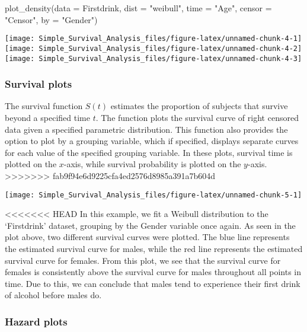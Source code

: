 \begin{Schunk}
\begin{Sinput}
plot_density(data = Firstdrink, dist = "weibull", time = "Age", censor = "Censor", by = "Gender")
\end{Sinput}

\texttt{[image: Simple\_Survival\_Analysis\_files/figure-latex/unnamed-chunk-4-1]} 
\texttt{[image: Simple\_Survival\_Analysis\_files/figure-latex/unnamed-chunk-4-2]} 
\texttt{[image: Simple\_Survival\_Analysis\_files/figure-latex/unnamed-chunk-4-3]} \end{Schunk}

\hypertarget{survival-plots-1}{%
\subsubsection{Survival plots}\label{survival-plots-1}}

The survival function \(S(t)\) estimates the proportion of subjects that
survive beyond a specified time \(t\). The  function
plots the survival curve of right censored data given a specified
parametric distribution. This function also provides the option to plot
by a grouping variable, which if specified, displays separate curves for
each value of the specified grouping variable. In these plots, survival
time is plotted on the \(x\)-axis, while survival probability is plotted
on the \(y\)-axis.
\textgreater{}\textgreater{}\textgreater{}\textgreater{}\textgreater{}\textgreater{}\textgreater{}
fab9f94e6d9225cfa4ed2576d8985a391a7b604d

\begin{Schunk}

\texttt{[image: Simple\_Survival\_Analysis\_files/figure-latex/unnamed-chunk-5-1]} \end{Schunk}

\textless{}\textless{}\textless{}\textless{}\textless{}\textless{}\textless{}
HEAD In this example, we fit a Weibull distribution to the `Firstdrink'
dataset, grouping by the Gender variable once again. As seen in the plot
above, two different survival curves were plotted. The blue line
represents the estimated survival curve for males, while the red line
represents the estimated survival curve for females. From this plot, we
see that the survival curve for females is consistently above the
survival curve for males throughout all points in time. Due to this, we
can conclude that males tend to experience their first drink of alcohol
before males do.

\hypertarget{hazard-plots}{%
\subsubsection{Hazard plots}\label{hazard-plots}}

